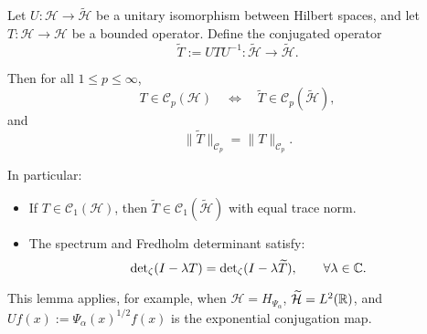 \begin{lemma}
\label{lem:unitary_conjugation_trace_class}
Let \( U \colon \mathcal{H} \to \widetilde{\mathcal{H}} \) be a unitary isomorphism between Hilbert spaces, and let \( T \colon \mathcal{H} \to \mathcal{H} \) be a bounded operator. Define the conjugated operator
\[
\widetilde{T} := U T U^{-1} \colon \widetilde{\mathcal{H}} \to \widetilde{\mathcal{H}}.
\]

Then for all \( 1 \le p \le \infty \),
\[
T \in \mathcal{C}_p(\mathcal{H}) \quad \iff \quad \widetilde{T} \in \mathcal{C}_p(\widetilde{\mathcal{H}}),
\]
and
\[
\| \widetilde{T} \|_{\mathcal{C}_p} = \| T \|_{\mathcal{C}_p}.
\]

In particular:
\begin{itemize}
  \item If \( T \in \mathcal{C}_1(\mathcal{H}) \), then \( \widetilde{T} \in \mathcal{C}_1(\widetilde{\mathcal{H}}) \) with equal trace norm.
  \item The spectrum and Fredholm determinant satisfy:
  \[
  \det\nolimits_\zeta(I - \lambda T) = \det\nolimits_\zeta(I - \lambda \widetilde{T}), \qquad \forall \lambda \in \mathbb{C}.
  \]
\end{itemize}

This lemma applies, for example, when \( \mathcal{H} = H_{\Psi_\alpha} \), \( \widetilde{\mathcal{H}} = L^2(\mathbb{R}) \), and \( U f(x) := \Psi_\alpha(x)^{1/2} f(x) \) is the exponential conjugation map.
\end{lemma}
